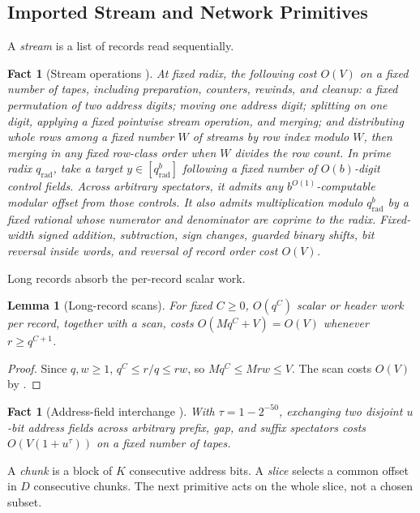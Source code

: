 \documentclass[11pt]{article}
\newtheorem{lemma}[theorem]{Lemma}
\newtheorem{fact}[theorem]{Fact}
\theoremstyle{definition}
\renewcommand{\label}[1]{}%
\begin{document}
\subsection{Imported Stream and Network Primitives}
\label{sec:prelim-imported}

A \emph{stream} is a list of records read sequentially.

\begin{fact}[Stream operations {\cite[Lemmas~3--4]{OAI26}}]
\label{fact:streams}
At fixed radix, the following cost $O(V)$ on a fixed number of tapes,
including preparation, counters, rewinds, and cleanup:
a fixed permutation of two address digits; moving one address digit;
splitting on one digit, applying a fixed pointwise stream operation, and merging;
and distributing whole rows among a fixed number $W$ of streams by row index
modulo $W$, then merging in any fixed row-class order when $W$ divides the
row count.
In prime radix $q_{\mathrm{rad}}$, take a target $y\in[q_{\mathrm{rad}}^b]$
following a fixed number of $O(b)$-digit control fields.
Across arbitrary spectators, it admits any $b^{O(1)}$-computable modular
offset from those controls.
It also admits multiplication modulo $q_{\mathrm{rad}}^b$ by a fixed rational
whose numerator and denominator are coprime to the radix.
Fixed-width signed addition, subtraction, sign changes, guarded binary shifts,
bit reversal inside words, and reversal of record order cost $O(V)$.
\end{fact}

Long records absorb the per-record scalar work.

\begin{lemma}[Long-record scans]\label{lem:long-scan}
For fixed $C\ge0$, $O(q^C)$ scalar or header work per record, together with
a scan, costs $O(Mq^C+V)=O(V)$ whenever $r\ge q^{C+1}$.
\end{lemma}
\begin{proof}
Since $q,w\ge1$, $q^C\le r/q\le rw$, so $Mq^C\le Mrw\le V$.
The scan costs $O(V)$ by .
\end{proof}

\begin{fact}[Address-field interchange {\cite[Lemma~12]{OAI26}}]
\label{fact:interchange}
With $\tau=1-2^{-50}$, exchanging two disjoint $u$-bit address fields across
arbitrary prefix, gap, and suffix spectators costs $O(V(1+u^\tau))$
on a fixed number of tapes.
\end{fact}

A \emph{chunk} is a block of $K$ consecutive address bits.
A \emph{slice} selects a common offset in $D$ consecutive chunks.
The next primitive acts on the whole slice, not a chosen subset.
\end{document}
